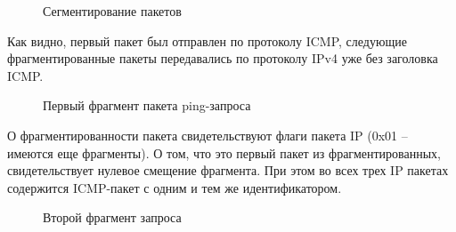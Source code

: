 \documentclass[a4paper, 14pt,russian]{article}
\begin{document}
		\newpage
		\begin{figure}[h!]
			\caption{Сегментирование пакетов}
			\label{img:frag_ping}
		\end{figure}
		
		Как видно, первый пакет был отправлен по протоколу ICMP, следующие фрагментированные пакеты передавались по протоколу IPv4 уже без заголовка ICMP.		
		
		\begin{figure}[h!]
			\caption{Первый фрагмент пакета ping-запроса}
			\label{img:frag_ping}
		\end{figure}
	
		О фрагментированности пакета свидетельствуют флаги пакета IP (0x01 – имеются еще фрагменты). О том, что это первый пакет из фрагментированных, свидетельствует нулевое смещение фрагмента. При этом во всех трех IP пакетах содержится ICMP-пакет с одним и тем же идентификатором.
		
		\begin{figure}[h!]
			\caption{Второй фрагмент запроса}
			\label{img:frag_ping}
		\end{figure}
	
\end{document}
